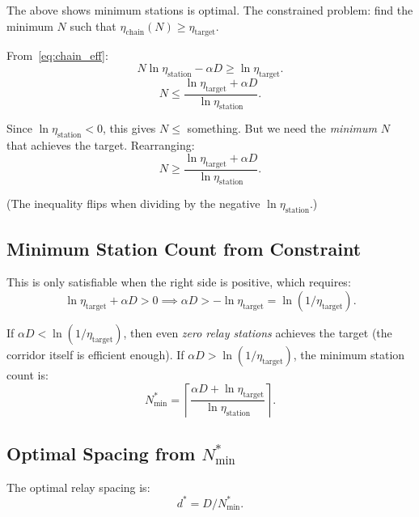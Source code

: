 \documentclass[aps,prd,twocolumn,superscriptaddress]{revtex4-2}
\begin{document}
The above shows minimum stations is optimal.  The constrained problem:
find the minimum $N$ such that $\eta_\mathrm{chain}(N) \geq \eta_\mathrm{target}$.

From~\eqref{eq:chain_eff}:
\begin{equation}
N\ln\eta_\mathrm{station} - \alpha D \geq \ln\eta_\mathrm{target}.
\label{eq:constraint}
\end{equation}
\begin{equation}
N \leq \frac{\ln\eta_\mathrm{target} + \alpha D}{\ln\eta_\mathrm{station}}.
\label{eq:N_constraint}
\end{equation}

Since $\ln\eta_\mathrm{station} < 0$, this gives $N \leq$ something.
But we need the \emph{minimum} $N$ that achieves the target.  Rearranging:
\begin{equation}
N \geq \frac{\ln\eta_\mathrm{target} + \alpha D}{\ln\eta_\mathrm{station}}.
\label{eq:N_min}
\end{equation}

(The inequality flips when dividing by the negative $\ln\eta_\mathrm{station}$.)

\subsection{Minimum Station Count from Constraint}

This is only satisfiable when the right side is positive, which requires:
\begin{equation}
\ln\eta_\mathrm{target} + \alpha D > 0
\implies \alpha D > -\ln\eta_\mathrm{target} = \ln(1/\eta_\mathrm{target}).
\label{eq:feasibility}
\end{equation}

If $\alpha D < \ln(1/\eta_\mathrm{target})$, then even \emph{zero relay
stations} achieves the target (the corridor itself is efficient enough).
If $\alpha D > \ln(1/\eta_\mathrm{target})$, the minimum station count is:
\begin{equation}
\boxed{
N^*_\mathrm{min} = \left\lceil
\frac{\alpha D + \ln\eta_\mathrm{target}}
{\ln\eta_\mathrm{station}}
\right\rceil.
}
\label{eq:N_min_formula}
\end{equation}

\subsection{Optimal Spacing from $N^*_\mathrm{min}$}

The optimal relay spacing is:
\begin{equation}
\boxed{
d^* = D / N^*_\mathrm{min}.
}
\label{eq:d_star}
\end{equation}
\end{document}
